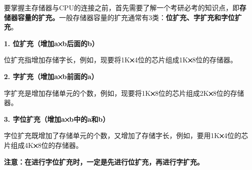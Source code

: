 要掌握主存储器与CPU的连接之前，首先需要了解一个考研必考的知识点，即\textbf{{存储器容量的扩充。}}{一般存储器容量的扩充通常有3类：}\textbf{位扩充、字扩充和字位扩充}{。}

\textbf{1.
位扩充（增加{a}\includegraphics[width=0.09375in,height=0.08333in]{texmath/ff0c81times}{b}后面的b）}

位扩充指增加存储字长，例如，现要将1K\textbf{\includegraphics[width=0.09375in,height=0.08333in]{texmath/ff0c81times}}4位的芯片组成1K\textbf{\includegraphics[width=0.09375in,height=0.08333in]{texmath/ff0c81times}}8位的存储器。

\textbf{2.
字扩充（增加{a}\includegraphics[width=0.09375in,height=0.08333in]{texmath/ff0c81times}{b}前面的a）}

字扩充是增加存储单元的个数，例如，现要将1K\textbf{\includegraphics[width=0.09375in,height=0.08333in]{texmath/ff0c81times}}8位的芯片组成2K\textbf{\includegraphics[width=0.09375in,height=0.08333in]{texmath/ff0c81times}}8位的存储器。

\textbf{3.
字位扩充（增加{a}\includegraphics[width=0.09375in,height=0.08333in]{texmath/ff0c81times}{b}中的a和b）}

字位扩充既增加了存储单元的个数，又增加了存储字长，例如，要用1K\textbf{\includegraphics[width=0.09375in,height=0.08333in]{texmath/ff0c81times}}4位的芯片组成4K\textbf{\includegraphics[width=0.09375in,height=0.08333in]{texmath/ff0c81times}}8位的存储器。

{\textbf{注意：在进行字位扩充时，一定是先进行位扩充，再进行字扩充。}}

